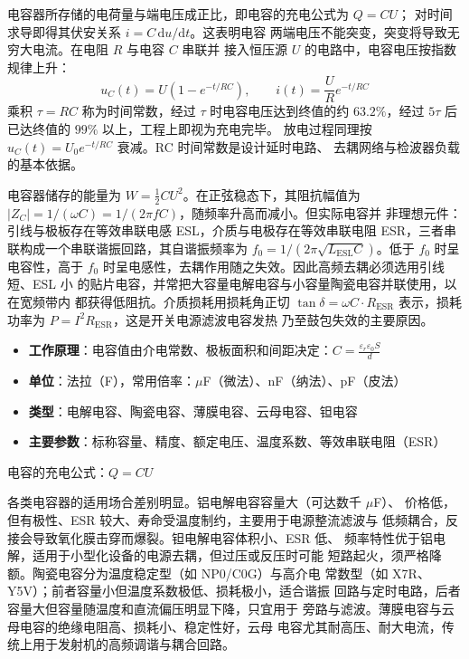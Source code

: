 电容器所存储的电荷量与端电压成正比，即电容的充电公式为 $Q = CU$；
对时间求导即得其伏安关系 $i = C\,\mathrm{d}u/\mathrm{d}t$。这表明电容
两端电压不能突变，突变将导致无穷大电流。在电阻 $R$ 与电容 $C$ 串联并
接入恒压源 $U$ 的电路中，电容电压按指数规律上升：
\begin{equation}
u_C(t) = U\left(1 - e^{-t/RC}\right), \qquad i(t) = \frac{U}{R}e^{-t/RC}
\end{equation}
乘积 $\tau = RC$ 称为时间常数，经过 $\tau$ 时电容电压达到终值的约
$63.2\%$，经过 $5\tau$ 后已达终值的 $99\%$ 以上，工程上即视为充电完毕。
放电过程同理按 $u_C(t) = U_0 e^{-t/RC}$ 衰减。RC 时间常数是设计延时电路、
去耦网络与检波器负载的基本依据。

电容器储存的能量为 $W = \tfrac{1}{2}CU^2$。在正弦稳态下，其阻抗幅值为
$|Z_C| = 1/(\omega C) = 1/(2\pi f C)$，随频率升高而减小。但实际电容并
非理想元件：引线与极板存在等效串联电感 ESL，介质与电极存在等效串联电阻
ESR，三者串联构成一个串联谐振回路，其自谐振频率为
$f_0 = 1/(2\pi\sqrt{L_{\mathrm{ESL}}C})$。低于 $f_0$ 时呈电容性，高于
$f_0$ 时呈电感性，去耦作用随之失效。因此高频去耦必须选用引线短、ESL 小
的贴片电容，并常把大容量电解电容与小容量陶瓷电容并联使用，以在宽频带内
都获得低阻抗。介质损耗用损耗角正切 $\tan\delta = \omega C \cdot R_{\mathrm{ESR}}$
表示，损耗功率为 $P = I^2 R_{\mathrm{ESR}}$，这是开关电源滤波电容发热
乃至鼓包失效的主要原因。

\begin{itemize}
    \item \textbf{工作原理}：电容值由介电常数、极板面积和间距决定：$C = \frac{\varepsilon_r\varepsilon_0 S}{d}$
    \item \textbf{单位}：法拉（F），常用倍率：$\mu$F（微法）、nF（纳法）、pF（皮法）
    \item \textbf{类型}：电解电容、陶瓷电容、薄膜电容、云母电容、钽电容
    \item \textbf{主要参数}：标称容量、精度、额定电压、温度系数、等效串联电阻（ESR）
\end{itemize}

电容的充电公式：$Q = CU$

各类电容器的适用场合差别明显。铝电解电容容量大（可达数千 $\mu$F）、
价格低，但有极性、ESR 较大、寿命受温度制约，主要用于电源整流滤波与
低频耦合，反接会导致氧化膜击穿而爆裂。钽电解电容体积小、ESR 低、
频率特性优于铝电解，适用于小型化设备的电源去耦，但过压或反压时可能
短路起火，须严格降额。陶瓷电容分为温度稳定型（如 NP0/C0G）与高介电
常数型（如 X7R、Y5V）；前者容量小但温度系数极低、损耗极小，适合谐振
回路与定时电路，后者容量大但容量随温度和直流偏压明显下降，只宜用于
旁路与滤波。薄膜电容与云母电容的绝缘电阻高、损耗小、稳定性好，云母
电容尤其耐高压、耐大电流，传统上用于发射机的高频调谐与耦合回路。

